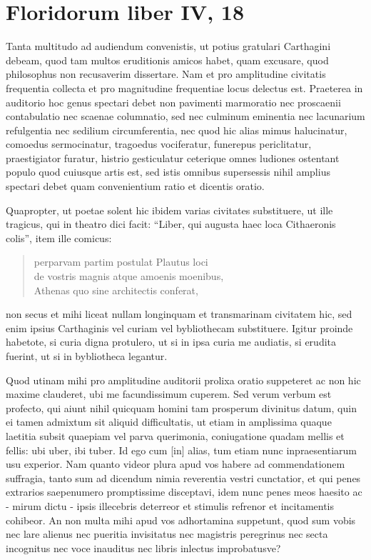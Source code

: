 
\section*{Floridorum liber IV, 18}
	
Tanta multitudo ad audiendum convenistis, ut potius gratulari Carthagini debeam, quod tam multos eruditionis amicos habet, quam excusare, quod philosophus non recusaverim dissertare. Nam et pro amplitudine civitatis frequentia collecta et pro magnitudine frequentiae locus delectus est. Praeterea in auditorio hoc genus spectari debet non pavimenti marmoratio nec proscaenii contabulatio nec scaenae columnatio, sed nec culminum eminentia nec lacunarium refulgentia nec sedilium circumferentia, nec quod hic alias mimus halucinatur, comoedus sermocinatur, tragoedus vociferatur, funerepus periclitatur, praestigiator furatur, histrio gesticulatur ceterique omnes ludiones ostentant populo quod cuiusque artis est, sed istis omnibus supersessis nihil amplius spectari debet quam convenientium ratio et dicentis oratio. 

Quapropter, ut poetae solent hic ibidem varias civitates substituere, ut ille tragicus, qui in theatro dici facit: ``Liber, qui augusta haec loca Cithaeronis colis'', item ille comicus:
\begin{verse}
perparvam partim postulat Plautus loci \\
de vostris magnis atque amoenis moenibus, \\
Athenas quo sine architectis conferat,
\end{verse}
non secus et mihi liceat nullam longinquam et transmarinam civitatem hic, sed enim ipsius Carthaginis vel curiam vel bybliothecam substituere. Igitur proinde habetote, si curia digna protulero, ut si in ipsa curia me audiatis, si erudita fuerint, ut si in bybliotheca legantur. 

Quod utinam mihi pro amplitudine auditorii prolixa oratio suppeteret ac non hic maxime clauderet, ubi me facundissimum cuperem. Sed verum verbum est profecto, qui aiunt nihil quicquam homini tam prosperum divinitus datum, quin ei tamen admixtum sit aliquid difficultatis, ut etiam in amplissima quaque laetitia subsit quaepiam vel parva querimonia, coniugatione quadam mellis et fellis: ubi uber, ibi tuber. Id ego cum [in] alias, tum etiam nunc inpraesentiarum usu experior. Nam quanto videor plura apud vos habere ad commendationem suffragia, tanto sum ad dicendum nimia reverentia vestri cunctatior, et qui penes extrarios saepenumero promptissime disceptavi, idem nunc penes meos haesito ac - mirum dictu - ipsis illecebris deterreor et stimulis refrenor et incitamentis cohibeor. An non multa mihi apud vos adhortamina suppetunt, quod sum vobis nec lare alienus nec pueritia invisitatus nec magistris peregrinus nec secta incognitus nec voce inauditus nec libris inlectus improbatusve? 

